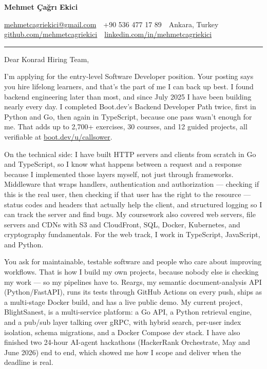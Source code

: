 \documentclass[11pt,a4paper]{article}
\begin{document}
{\LARGE\bfseries\color{accent} Mehmet Çağrı Ekici}\par
\vspace{2pt}
{\small
\href{mailto:mehmetcagriekici@gmail.com}{mehmetcagriekici@gmail.com} \,\textbullet\,
+90 536 477 17 89 \,\textbullet\,
Ankara, Turkey \,\textbullet\,
\href{https://github.com/mehmetcagriekici}{github.com/mehmetcagriekici} \,\textbullet\,
\href{https://linkedin.com/in/mehmetcagriekici}{linkedin.com/in/mehmetcagriekici}
}

\vspace{10pt}
\hrule
\vspace{14pt}

Dear Konrad Hiring Team,

I'm applying for the entry-level Software Developer position. Your posting says you hire lifelong learners, and that's the part of me I can back up best. I found backend engineering later than most, and since July 2025 I have been building nearly every day. I completed Boot.dev's Backend Developer Path twice, first in Python and Go, then again in TypeScript, because one pass wasn't enough for me. That adds up to 2,700+ exercises, 30 courses, and 12 guided projects, all verifiable at \href{https://www.boot.dev/u/callsower}{boot.dev/u/callsower}.

On the technical side: I have built HTTP servers and clients from scratch in Go and TypeScript, so I know what happens between a request and a response because I implemented those layers myself, not just through frameworks. Middleware that wraps handlers, authentication and authorization --- checking if this is the real user, then checking if that user has the right to the resource --- status codes and headers that actually help the client, and structured logging so I can track the server and find bugs. My coursework also covered web servers, file servers and CDNs with S3 and CloudFront, SQL, Docker, Kubernetes, and cryptography fundamentals. For the web track, I work in TypeScript, JavaScript, and Python.

You ask for maintainable, testable software and people who care about improving workflows. That is how I build my own projects, because nobody else is checking my work --- so my pipelines have to. Reargs, my semantic document-analysis API (Python/FastAPI), runs its tests through GitHub Actions on every push, ships as a multi-stage Docker build, and has a live public demo. My current project, BlightSanest, is a multi-service platform: a Go API, a Python retrieval engine, and a pub/sub layer talking over gRPC, with hybrid search, per-user index isolation, schema migrations, and a Docker Compose dev stack. I have also finished two 24-hour AI-agent hackathons (HackerRank Orchestrate, May and June 2026) end to end, which showed me how I scope and deliver when the deadline is real.
\end{document}
